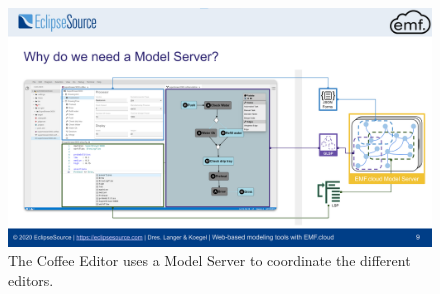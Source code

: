 \begin{figure}[!htb] 
  \centering
  \includegraphics[width=\textwidth]{figures/coffee-maker-architecture.png}
  \caption[Coffee Editor IDE Model Server]{The Coffee Editor uses a Model Server to coordinate the different editors.~\cite[p.~9]{philiplangerWebbasedModelingTools2020}}\label{fig:coffee-maker-model-server}
\end{figure}

